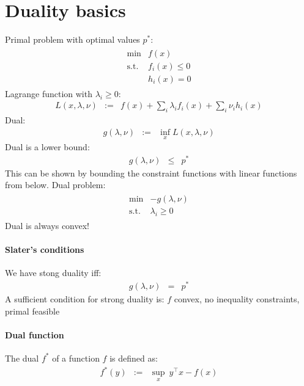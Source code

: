 \documentclass[10pt,english]{article}
\begin{document}
\clearpage
\section{Duality basics}
Primal problem with optimal values $p^\ast$:
\begin{eqnarray*}
 \begin{array}{ll} 	\mbox{min}	&	f(x)\\
			\mbox{s.t.}	&	f_i(x)\leq 0\\
					&	h_i(x)=0
 \end{array}
\end{eqnarray*}
Lagrange function with $\lambda_i\geq0$:
\begin{eqnarray*}
 L(x,\lambda,\nu)	&:=&	f(x)+\sum_{i}\lambda_if_i(x)+\sum_i\nu_ih_i(x)
\end{eqnarray*}
Dual:
\begin{eqnarray*}
 g(\lambda,\nu)	&:=&	\inf_x L(x,\lambda,\nu)
\end{eqnarray*}
Dual is a lower bound:
\begin{eqnarray*}
 g(\lambda,\nu)	&\leq&	p^\ast
\end{eqnarray*}
This can be shown by bounding the constraint functions with linear functions from below.
Dual problem:
\begin{eqnarray*}
 \begin{array}{ll} 	\mbox{min}	&	-g(\lambda,\nu)\\
			\mbox{s.t.}	&	\lambda_i\geq 0
 \end{array}
\end{eqnarray*}
Dual is always convex!
\paragraph{Slater's conditions}
We have stong duality iff:
\begin{eqnarray*}
 g(\lambda,\nu)	&=&	p^\ast
\end{eqnarray*}
A sufficient condition for strong duality is: $f$ convex, no inequality constraints, primal feasible

\paragraph{Dual function}
The dual $f^\ast$ of a function $f$ is defined as:
\begin{eqnarray*}
 f^\ast(y)	&:=&	\sup_x \   y^\top x - f(x)
\end{eqnarray*}
\end{document}
